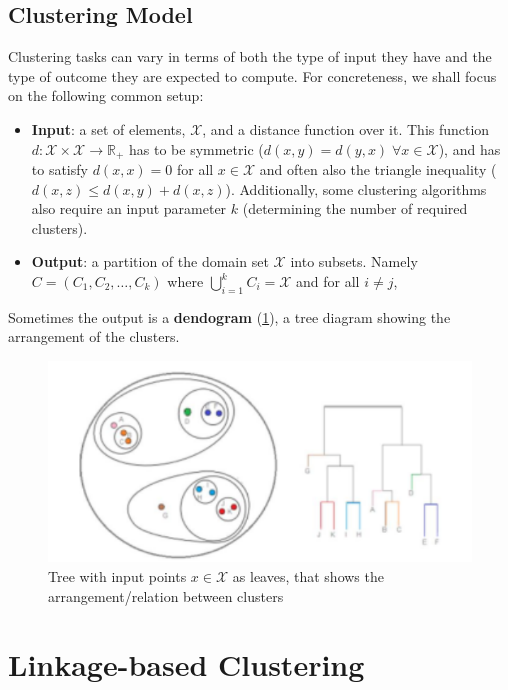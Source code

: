 \documentclass[12pt]{report}
\theoremstyle{plain}
\newcommand\mcl[1]{\mathcal{#1}}
\begin{document}
\begin{flushleft}
\subsection{Clustering Model}
Clustering tasks can vary in terms of both the type of input they have and the type of outcome they are expected to compute. For concreteness, we shall focus on the following common setup:
\begin{itemize}
	\item \textbf{Input}: a set of elements, $\mcl{X}$, and a distance function over it. This function $d:\mcl{X}\times\mcl{X}\to\mathds{R}_+$ has to be symmetric ($d(x,y)=d(y,x)\;\forall x\in\mcl{X}$), and has to satisfy $d(x,x)=0$ for all $x\in\mcl{X}$ and often also the triangle inequality ($d(x,z)\leq d(x,y)+d(x,z)$). Additionally, some clustering algorithms also require an input parameter $k$ (determining the number of required clusters).
	\item \textbf{Output}: a partition of the domain set $\mcl{X}$ into subsets. Namely $C=(C_1,C_2,\dots,C_k)$ where $\bigcup_{i=1}^k C_i=\mcl{X}$ and for all $i\neq j$,%
\end{itemize}
Sometimes the output is a \textbf{dendogram} (\ref{fig:dendogram}), a tree diagram showing the arrangement of the clusters.
\begin{figure}[!h]
	\centering
	\includegraphics[scale=1]{images/dendogram.pdf}
	\caption{Tree with input points $x\in\mcl{X}$ as leaves, that shows the arrangement/relation between clusters}
	\label{fig:dendogram}
\end{figure}

\section{Linkage-based Clustering}







\end{flushleft}
\end{document}
